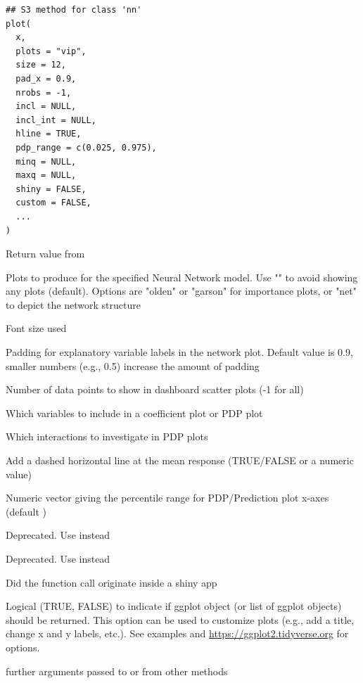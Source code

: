 \documentclass[a4paper]{book}
\begin{document}
%
\begin{Usage}
\begin{verbatim}
## S3 method for class 'nn'
plot(
  x,
  plots = "vip",
  size = 12,
  pad_x = 0.9,
  nrobs = -1,
  incl = NULL,
  incl_int = NULL,
  hline = TRUE,
  pdp_range = c(0.025, 0.975),
  minq = NULL,
  maxq = NULL,
  shiny = FALSE,
  custom = FALSE,
  ...
)
\end{verbatim}
\end{Usage}
%
\begin{Arguments}
\begin{ldescription}
\item[\code{x}] Return value from 

\item[\code{plots}] Plots to produce for the specified Neural Network model. Use "" to avoid showing any plots (default). Options are "olden" or "garson" for importance plots, or "net" to depict the network structure

\item[\code{size}] Font size used

\item[\code{pad\_x}] Padding for explanatory variable labels in the network plot. Default value is 0.9, smaller numbers (e.g., 0.5) increase the amount of padding

\item[\code{nrobs}] Number of data points to show in dashboard scatter plots (-1 for all)

\item[\code{incl}] Which variables to include in a coefficient plot or PDP plot

\item[\code{incl\_int}] Which interactions to investigate in PDP plots

\item[\code{hline}] Add a dashed horizontal line at the mean response (TRUE/FALSE or a numeric value)

\item[\code{pdp\_range}] Numeric vector  giving the percentile range for PDP/Prediction plot x-axes (default )

\item[\code{minq}] Deprecated. Use  instead

\item[\code{maxq}] Deprecated. Use  instead

\item[\code{shiny}] Did the function call originate inside a shiny app

\item[\code{custom}] Logical (TRUE, FALSE) to indicate if ggplot object (or list of ggplot objects) should be returned. This option can be used to customize plots (e.g., add a title, change x and y labels, etc.). See examples and \url{https://ggplot2.tidyverse.org} for options.

\item[\code{...}] further arguments passed to or from other methods
\end{ldescription}
\end{Arguments}
\end{document}
